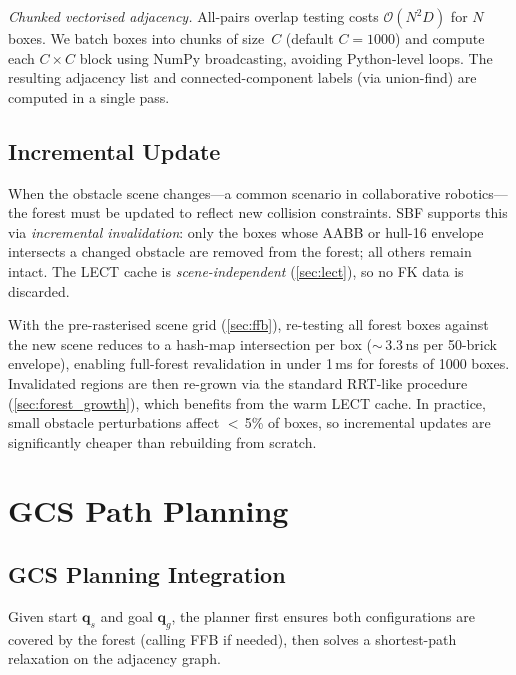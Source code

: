 \documentclass[journal]{IEEEtran}
\newcommand{\calO}{\mathcal{O}}
\begin{document}
\emph{Chunked vectorised adjacency.}
All-pairs overlap testing costs $\calO(N^2 D)$ for $N$ boxes.
We batch boxes into chunks of size~$C$ (default $C{=}1000$)
and compute each $C{\times}C$ block using NumPy broadcasting,
avoiding Python-level loops.
The resulting adjacency list and connected-component labels
(via union-find) are computed in a single pass.

\subsection{Incremental Update}\label{sec:incremental}

When the obstacle scene changes---a common scenario in
collaborative robotics---the forest must be updated to
reflect new collision constraints.
SBF supports this via \emph{incremental invalidation}:
only the boxes whose AABB or hull-16 envelope intersects a
changed obstacle are removed from the forest; all others
remain intact.
The LECT cache is \emph{scene-independent}
(\cref{sec:lect}), so no FK data is discarded.

With the pre-rasterised scene grid (\cref{sec:ffb}),
re-testing all forest boxes against the new scene reduces
to a hash-map intersection per box ($\sim$\,3.3\,ns per
50-brick envelope), enabling full-forest revalidation in
under 1\,ms for forests of 1000 boxes.
Invalidated regions are then re-grown via the standard
RRT-like procedure (\cref{sec:forest_growth}), which
benefits from the warm LECT cache.
In practice, small obstacle perturbations affect $<$\,5\%
of boxes, so incremental updates are significantly cheaper
than rebuilding from scratch.

\section{GCS Path Planning}\label{sec:planner}


\subsection{GCS Planning Integration}\label{sec:gcs_planning}

Given start $\bm{q}_s$ and goal $\bm{q}_g$, the planner
first ensures both configurations are covered by the forest
(calling FFB if needed), then solves a shortest-path relaxation
on the adjacency graph.
\end{document}
